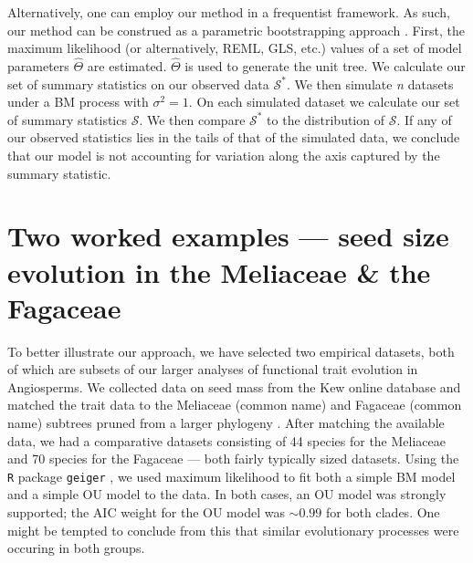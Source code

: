 \documentclass[a4paper,12pt]{article}
\begin{document}
Alternatively, one can employ our method in a frequentist framework. As such, our method can be construed as a parametric bootstrapping approach \citep{Efronbootstrap}. First, the maximum likelihood (or alternatively, REML, GLS, etc.) values of a set of model parameters $\hat{\Theta}$ are estimated. $\hat{\Theta}$ is used to  generate the unit tree. We calculate our set of summary statistics on our observed data $\mathcal{S}^*$. We then simulate \textit{n} datasets under a BM process with $\sigma^2 = 1$. On each simulated dataset we calculate our set of summary statistics $\mathcal{S}$. We then compare $\mathcal{S}^*$ to the distribution of $\mathcal{S}$. If any of our observed statistics lies in the tails of that of the simulated data, we conclude that our model is not accounting for variation along the axis captured by the summary statistic.


\section*{Two worked examples --- seed size evolution in the Meliaceae \& the Fagaceae}
To better illustrate our approach, we have selected two empirical datasets, both of which are subsets of our larger analyses of functional trait evolution in Angiosperms. We collected data on seed mass from the Kew online database \citep{Kew2008} and matched the trait data to the Meliaceae (common name) and Fagaceae (common name) subtrees pruned from a larger phylogeny \citep{Zanne2013}. After matching the available data, we had a comparative datasets consisting of 44 species for the Meliaceae and 70 species for the Fagaceae --- both fairly typically sized datasets.  Using the \texttt{R} package \texttt{geiger} \citep{geiger}, we used maximum likelihood to fit both a simple BM model and a simple OU model to the data. In both cases, an OU model was strongly supported; the AIC weight for the OU model was $\sim 0.99$ for both clades. One might be tempted to conclude from this that similar evolutionary processes were occuring in both groups. 
\end{document}
